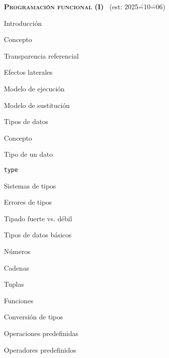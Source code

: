 \begin{longenum}
    \item \textbf{\textsc{Programación funcional (I)}} \ (est: 2025\==10\==06)
    \begin{longenum}
        \item Introducción
        \begin{longenum}
            \item Concepto
            \item Transparencia referencial
            \begin{longenum}
                \item Efectos laterales
            \end{longenum}
            \item Modelo de ejecución
            \begin{longenum}
                \item Modelo de sustitución
            \end{longenum}
        \end{longenum}
        \item Tipos de datos
        \begin{longenum}
            \item Concepto
            \item Tipo de un dato
            \item \texttt{type}
            \item Sistemas de tipos
            \begin{longenum}
                \item Errores de tipos
                \item Tipado fuerte vs. débil
            \end{longenum}
            \item Tipos de datos básicos
            \begin{longenum}
                \item Números
                \item Cadenas
                \item Tuplas
                \item Funciones
            \end{longenum}
            \item Conversión de tipos
        \end{longenum}
        \item Operaciones predefinidas
        \begin{longenum}
            \item Operadores predefinidos

\end{longenum}
\end{longenum}
\end{longenum}
